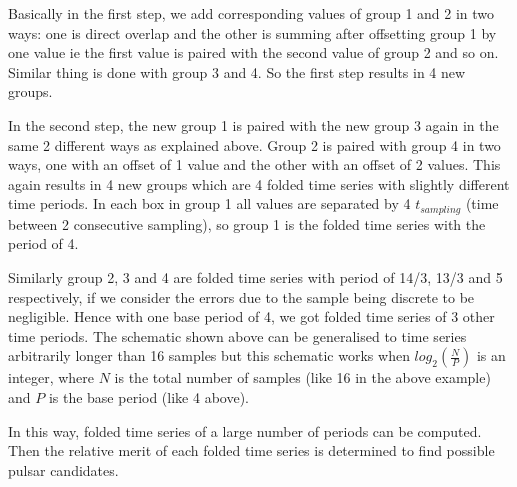 \documentclass[12pt,a4paper, margin=3in]{article}
\begin{document}

Basically in the first step, we add corresponding values of group 1 and 2 in two ways: one is direct overlap and the other is summing after offsetting group 1 by one value ie the first value is paired with the second value of group 2 and so on. Similar thing is done with group 3 and 4. So the first step results in 4 new groups.

In the second step, the new group 1 is paired with the new group 3 again in the same 2 different ways as explained above. Group 2 is paired with group 4 in two ways, one with an offset of 1 value and the other with an offset of 2 values. This again results in 4 new groups which are 4 folded time series with slightly different time periods. In each box in group 1 all values are separated by 4 $t_{sampling}$ (time between 2 consecutive sampling), so group 1 is the folded time series with the period of 4.

Similarly group 2, 3 and 4 are folded time series with period of 14/3, 13/3 and 5 respectively, if we consider the errors due to the sample being discrete to be negligible. Hence with one base period of 4, we got folded time series of 3 other time periods. The schematic shown above can be generalised to time series arbitrarily longer than 16 samples but this schematic works when $log_{2} (\frac{N}{P})$ is an integer, where $N$ is the total number of samples (like 16 in the above example) and $P$ is the base period (like 4 above). 

In this way, folded time series of a large number of periods can be computed. Then the relative merit of each folded time series is determined to find possible pulsar candidates. 
\end{document}
